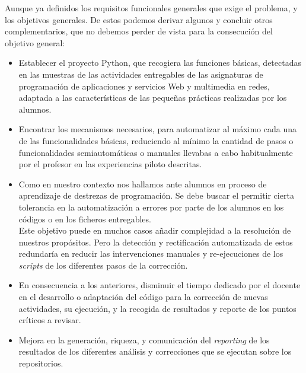 Aunque ya definidos los requisitos funcionales generales que exige el problema, y los objetivos generales. De estos podemos derivar algunos y concluir otros complementarios, que no debemos perder de vista para la consecución del objetivo general:\\


\begin{itemize}
\item Establecer el proyecto Python, que recogiera las funciones básicas, detectadas en las muestras de las actividades entregables de las asignaturas de programación de aplicaciones y servicios Web y multimedia en redes, adaptada a las características de las pequeñas prácticas realizadas por los alumnos.\\

\item Encontrar los mecanismos necesarios, para automatizar al máximo cada una de las funcionalidades básicas, reduciendo al mínimo la cantidad de pasos o funcionalidades semiautomáticas o manuales llevabas a cabo habitualmente por el profesor en las experiencias piloto descritas.\\

\item Como en nuestro contexto nos hallamos ante alumnos en proceso de aprendizaje de destrezas de programación. Se debe buscar el permitir cierta tolerancia en la automatización a errores por parte de los alumnos en los códigos o en los ficheros entregables.\\


Este objetivo puede en muchos casos añadir complejidad a la resolución de nuestros propósitos. Pero la detección y rectificación automatizada de estos redundaría en reducir las intervenciones manuales y re-ejecuciones de los \textit{scripts} de los diferentes pasos de la corrección.\\

\item En consecuencia a los anteriores, disminuir el tiempo dedicado por el docente en el desarrollo o adaptación del código para la corrección de nuevas actividades, su ejecución, y la recogida de resultados y reporte de los puntos críticos a revisar.\\

\item Mejora en la generación, riqueza, y comunicación del \textit{reporting} de los resultados de los diferentes análisis y correcciones que se ejecutan sobre los repositorios.\\


\end{itemize}
